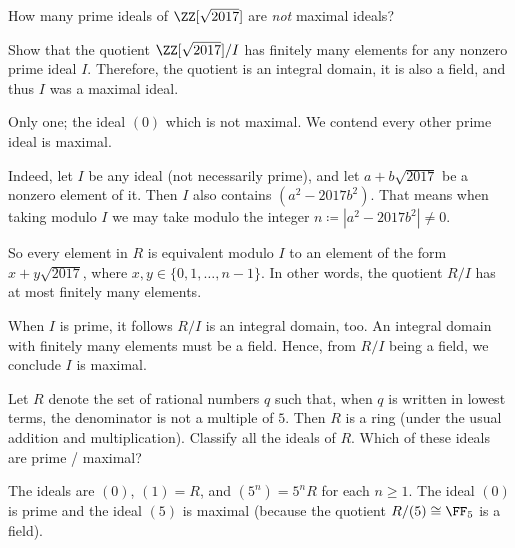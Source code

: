 \begin{dproblem}
	How many prime ideals of $\ZZ[\sqrt{2017}]$ are \emph{not} maximal ideals?
	\label{prob:dedekind_sample}
	\begin{hint}
		Show that the quotient $\ZZ[\sqrt{2017}]/I$ has finitely many elements
		for any nonzero prime ideal $I$.
		Therefore, the quotient is an integral domain, it is also a field,
		and thus $I$ was a maximal ideal.
	\end{hint}
	\begin{sol}
		Only one; the ideal $(0)$ which is not maximal.
		We contend every other prime ideal is maximal.

		Indeed, let $I$ be any ideal (not necessarily prime),
		and let $a + b \sqrt{2017}$ be a nonzero element of it.
		Then $I$ also contains $(a^2-2017b^2)$.
		That means when taking modulo $I$ we may take modulo the integer
		$n \coloneqq |a^2-2017b^2| \neq 0$.

		So every element in $R$ is equivalent modulo $I$
		to an element of the form $x + y \sqrt{2017}$,
		where $x,y \in \{0, 1, \dots, n-1\}$.
		In other words, the quotient $R/I$ has at most finitely many elements.

		When $I$ is prime, it follows $R/I$ is an integral domain, too.
		An integral domain with finitely many elements must be a field.
		Hence, from $R/I$ being a field, we conclude $I$ is maximal.
	\end{sol}
\end{dproblem}

\begin{problem}
	Let $R$ denote the set of rational numbers $q$ such that,
	when $q$ is written in lowest terms, the denominator is not a multiple of $5$.
	Then $R$ is a ring (under the usual addition and multiplication).
	Classify all the ideals of $R$.
	Which of these ideals are prime / maximal?
	\begin{sol}
		The ideals are $(0)$, $(1) = R$, and $(5^n) = 5^n R$ for each $n \ge 1$.
		The ideal $(0)$ is prime and the ideal $(5)$ is maximal
		(because the quotient $R/(5) \cong \FF_5$ is a field).
	\end{sol}
\end{problem}
